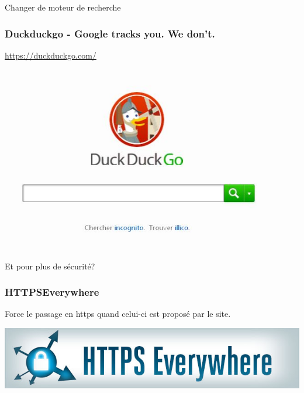 \documentclass{beamer}
\begin{document}
\begin{frame}
\begin{center}
\Huge{Changer de moteur de recherche}
\end{center}
\end{frame}

\begin{frame}
\begin{center}
\frametitle{Duckduckgo - Google tracks you. We don't.}

\url{https://duckduckgo.com/}
\\
\includegraphics[scale=0.6] {./images/DuckDuckGo.jpg}
\end{center}
\end{frame}

\begin{frame}
\begin{center}
\Huge{Et pour plus de sécurité?}
\end{center}
\end{frame}

\begin{frame}
\frametitle{HTTPSEverywhere}

Force le passage en https quand celui-ci est proposé par le site.

\begin{center}
\includegraphics[scale=0.4] {./images/https-everywhere.jpg}
\end{center}

\end{frame}
\end{document}
